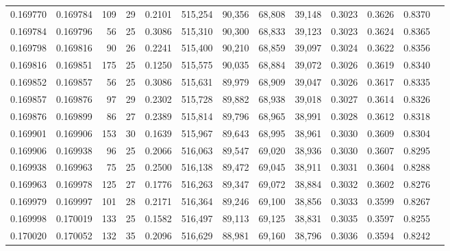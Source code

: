 \begin{tabular}{rrrrrrrrrrrrr}
0.169770 & 0.169784 & 109 &  29 &                                     0.2101 & 515,254 &  90,356 &  68,808 &  39,148 & 0.3023 & 0.3626 & 0.8370 \\
0.169784 & 0.169796 &  56 &  25 &                                     0.3086 & 515,310 &  90,300 &  68,833 &  39,123 & 0.3023 & 0.3624 & 0.8365 \\
0.169798 & 0.169816 &  90 &  26 &                                     0.2241 & 515,400 &  90,210 &  68,859 &  39,097 & 0.3024 & 0.3622 & 0.8356 \\
0.169816 & 0.169851 & 175 &  25 &                                     0.1250 & 515,575 &  90,035 &  68,884 &  39,072 & 0.3026 & 0.3619 & 0.8340 \\
0.169852 & 0.169857 &  56 &  25 &                                     0.3086 & 515,631 &  89,979 &  68,909 &  39,047 & 0.3026 & 0.3617 & 0.8335 \\
0.169857 & 0.169876 &  97 &  29 &                                     0.2302 & 515,728 &  89,882 &  68,938 &  39,018 & 0.3027 & 0.3614 & 0.8326 \\
0.169876 & 0.169899 &  86 &  27 &                                     0.2389 & 515,814 &  89,796 &  68,965 &  38,991 & 0.3028 & 0.3612 & 0.8318 \\
0.169901 & 0.169906 & 153 &  30 &                                     0.1639 & 515,967 &  89,643 &  68,995 &  38,961 & 0.3030 & 0.3609 & 0.8304 \\
0.169906 & 0.169938 &  96 &  25 &                                     0.2066 & 516,063 &  89,547 &  69,020 &  38,936 & 0.3030 & 0.3607 & 0.8295 \\
0.169938 & 0.169963 &  75 &  25 &                                     0.2500 & 516,138 &  89,472 &  69,045 &  38,911 & 0.3031 & 0.3604 & 0.8288 \\
0.169963 & 0.169978 & 125 &  27 &                                     0.1776 & 516,263 &  89,347 &  69,072 &  38,884 & 0.3032 & 0.3602 & 0.8276 \\
0.169979 & 0.169997 & 101 &  28 &                                     0.2171 & 516,364 &  89,246 &  69,100 &  38,856 & 0.3033 & 0.3599 & 0.8267 \\
0.169998 & 0.170019 & 133 &  25 &                                     0.1582 & 516,497 &  89,113 &  69,125 &  38,831 & 0.3035 & 0.3597 & 0.8255 \\
0.170020 & 0.170052 & 132 &  35 &                                     0.2096 & 516,629 &  88,981 &  69,160 &  38,796 & 0.3036 & 0.3594 & 0.8242 \\

\end{tabular}
